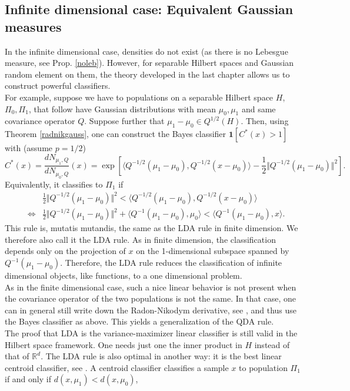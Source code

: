 \documentclass[10pt, a4paper]{report}
\newcommand{\R}[0]{\mathbb{R}}
\theoremstyle{definition}
\theoremstyle{remark}
\begin{document}
\subsection{Infinite dimensional case: Equivalent Gaussian measures}
In the infinite dimensional case, densities do not exist (as there is no Lebesgue measure, see Prop. \ref{noleb}). However, for separable Hilbert spaces and Gaussian random element on them, the theory developed in the last chapter allows us to construct powerful classifiers. \\
For example, suppose we have to populations on a separable Hilbert space $H$, $\Pi_0,\Pi_1$, that follow have Gaussian distributions with mean $\mu_0,\mu_1$ and same covariance operator $Q$. Suppose further that $\mu_1-\mu_0 \in Q^{1/2}(H)$. Then, using Theorem \ref{radnikgauss}, one can construct the Bayes classifier $\mathbf{1}[C^*(x)>1]$ with (assume $p=1/2$)
$$C^*(x) = \frac{dN_{\mu_1,Q}}{dN_{\mu_0,Q}}(x) =  \exp\left[\langle Q^{-1/2}(\mu_1-\mu_0),Q^{-1/2}(x-\mu_0)\rangle - \frac{1}{2} \Vert Q^{-1/2}(\mu_1-\mu_0)\Vert^2 \right].$$
Equivalently, it classifies to $\Pi_1$ if 
\begin{eqnarray*}
	& & \frac{1}{2} \Vert Q^{-1/2}(\mu_1-\mu_0)\Vert^2 <\langle Q^{-1/2}(\mu_1-\mu_0),Q^{-1/2}(x-\mu_0)\rangle  \\
	& \iff & \frac{1}{2} \Vert Q^{-1/2}(\mu_1-\mu_0)\Vert^2 + \langle Q^{-1}(\mu_1-\mu_0),\mu_0\rangle < \langle Q^{-1}(\mu_1-\mu_0),x\rangle.
\end{eqnarray*}
This rule is, mutatis mutandis, the same as the LDA rule in finite dimension. We therefore also call it the LDA rule. As in finite dimension, the classification depends only on the projection of $x$ on the 1-dimensional subspace spanned by $Q^{-1}(\mu_1-\mu_0)$. Therefore, the LDA rule reduces the classification of infinite dimensional objects, like functions, to a one dimensional problem.\\
As in the finite dimensional case, such a nice linear behavior is not present when the covariance operator of the two populations is not the same. In that case, one can in general still write down the Radon-Nikodym derivative, see \cite[Coro. 6.4.11]{boga}, and thus use the Bayes classifier as above. This yields a generalization of the QDA rule.\\
The proof that LDA is the variance-maximizer linear classifier is still valid in the Hilbert space framework. One needs just one the inner product in $H$ instead of that of $\R^d$. The LDA rule is also optimal in another way: it is the best linear centroid classifier, see \cite[Section 2.2]{DH3}. A centroid classifier classifies a sample $x$ to population $\Pi_1$ if and only if $d(x,\mu_1)<d(x,\mu_0)$,
\end{document}

